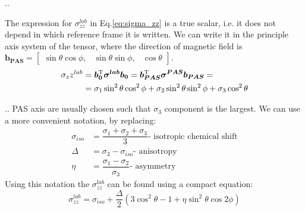 \documentclass[handout]{beamer}
\begin{document}
\begin{frame}{\thesection.\thesubsection. \insertsubsection}
   
   
   The expression for $\sigma_{zz}^{lab}$ in Eq.\ref{eq:sigma_zz} is a true scalar, i.e. it does not depend in which reference frame it is written. We can write it in the principle axis system of the tensor, where the direction of magnetic field is $\bm{b_{PAS}} = \begin{bmatrix} \sin \theta \cos \phi, & \sin \theta \sin \phi,   & \cos \theta \end{bmatrix}  $.
   \begin{align}
      \sigma_zz^{lab} &= \bm{b_0}^{\rm T} \bm{\sigma^{lab}} \bm{b_0} = \bm{b_{PAS}}^{\rm T} \bm{\sigma^{PAS}} \bm{b_{PAS}} = \\
      &= \sigma_1 \sin^2 \theta \cos^2 \phi + \sigma_2 \sin^2 \theta \sin^2 \phi + \sigma_3 \cos^2 \theta 
   \end{align}

\end{frame}   
\begin{frame}{\thesection.\thesubsection. \insertsubsection}
    PAS axis are usually chosen such that  $\sigma_3$ component is the largest. We can use a more convenient notation, by replacing:
    \begin{align}
       \sigma_{iso} &= \dfrac{\sigma_1  + \sigma_2 + \sigma_3}{3}  \text{- isotropic chemical shift} \\
       \Delta &= \sigma_3 - \sigma_{iso} \text{- anisotropy} \\
       \eta &= \dfrac{\sigma_1 - \sigma_2}{\sigma_3} \text{- asymmetry}
    \end{align}
    Using this notation the $\sigma_{zz}^{lab}$ can be found using a compact equation:
    \begin{equation}
       \sigma_{zz}^{lab} = \sigma_{iso} + \dfrac{\Delta}{2}(3 \cos^2 \theta -1 + \eta \sin^2 \theta \cos 2 \phi)
    \end{equation}
\end{frame}
\end{document}
